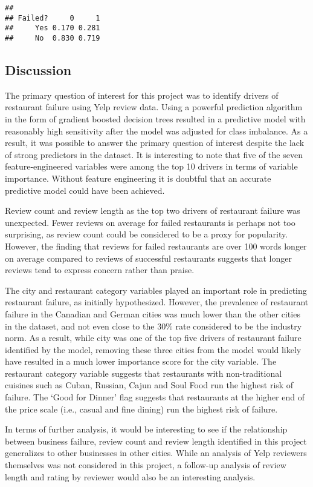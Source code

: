 \documentclass[]{article}
\begin{document}
\begin{verbatim}
##        
## Failed?     0     1
##     Yes 0.170 0.281
##     No  0.830 0.719
\end{verbatim}

\subsection{Discussion}\label{discussion}

The primary question of interest for this project was to identify
drivers of restaurant failure using Yelp review data. Using a powerful
prediction algorithm in the form of gradient boosted decision trees
resulted in a predictive model with reasonably high sensitivity after
the model was adjusted for class imbalance. As a result, it was possible
to answer the primary question of interest despite the lack of strong
predictors in the dataset. It is interesting to note that five of the
seven feature-engineered variables were among the top 10 drivers in
terms of variable importance. Without feature engineering it is doubtful
that an accurate predictive model could have been achieved.

Review count and review length as the top two drivers of restaurant
failure was unexpected. Fewer reviews on average for failed restaurants
is perhaps not too surprising, as review count could be considered to be
a proxy for popularity. However, the finding that reviews for failed
restaurants are over 100 words longer on average compared to reviews of
successful restaurants suggests that longer reviews tend to express
concern rather than praise.

The city and restaurant category variables played an important role in
predicting restaurant failure, as initially hypothesized. However, the
prevalence of restaurant failure in the Canadian and German cities was
much lower than the other cities in the dataset, and not even close to
the 30\% rate considered to be the industry norm. As a result, while
city was one of the top five drivers of restaurant failure identified by
the model, removing these three cities from the model would likely have
resulted in a much lower importance score for the city variable. The
restaurant category variable suggests that restaurants with
non-traditional cuisines such as Cuban, Russian, Cajun and Soul Food run
the highest risk of failure. The `Good for Dinner' flag suggests that
restaurants at the higher end of the price scale (i.e., casual and fine
dining) run the highest risk of failure.

In terms of further analysis, it would be interesting to see if the
relationship between business failure, review count and review length
identified in this project generalizes to other businesses in other
cities. While an analysis of Yelp reviewers themselves was not
considered in this project, a follow-up analysis of review length and
rating by reviewer would also be an interesting analysis.
\end{document}
